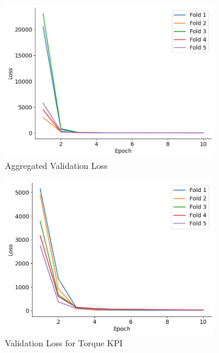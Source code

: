 \documentclass{report} %
\begin{document}
\begin{figure}[H]
    \centering
    \begin{subfigure}{0.32\textwidth}
        \centering
        \includegraphics[width=\textwidth]{./ReportImages/val_loss.png}
        \caption{\centering Aggregated Validation Loss}
        \label{fig:Aggregated Validation Loss}
    \end{subfigure}\hfill
    \begin{subfigure}{0.32\textwidth}
        \centering
        \includegraphics[width=\textwidth]{./ReportImages/val_loss_y1.png}
        \caption{\centering Validation Loss for Torque \ac{KPI}}
        \label{fig:Validation Loss for Torque Curve}
    \end{subfigure}\hfill
    \begin{subfigure}{0.32\textwidth}

\end{subfigure}
\end{figure}
\end{document}
